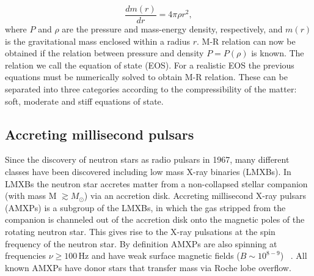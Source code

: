 \documentclass{wihuri}
\begin{document}
\begin{equation}
 \frac{dm(r)}{dr} = 4 \pi \rho r^{2},
 \end{equation}
where $P$ and $\rho$ are the pressure and mass-energy density, respectively, and $m(r)$ is the gravitational mass enclosed within a radius $r$. M-R relation can now be obtained if the relation between pressure and density $P=P(\rho)$ is known. The relation we call the equation of state (EOS). For a realistic EOS the previous equations must be numerically solved to obtain M-R relation. These can be separated into three categories according to the compressibility of the matter: soft, moderate and stiff equations of state.




\subsection{Accreting millisecond pulsars}




Since the discovery of neutron stars as radio pulsars
in 1967, many different classes have been discovered including low mass X-ray binaries (LMXBs). In LMXBs the neutron star accretes matter from a non-collapsed stellar companion (with mass M $\gtrsim  M_{\odot}$) via an accretion disk. Accreting millisecond X-ray pulsars (AMXPs) is a subgroup of the LMXBs, in which the gas stripped from the companion is channeled out of the accretion disk onto the magnetic poles of the rotating neutron star. This gives rise to the X-ray pulsations at the spin frequency of the neutron star. By definition AMXPs are also spinning at frequencies $\nu \ge 100 \, \mathrm{Hz}$ and have weak surface magnetic fields ($B \sim 10^{8-9}$) ~\cite{patruno}. All known AMXPs have donor stars that transfer mass via Roche lobe overflow. 
\end{document}

